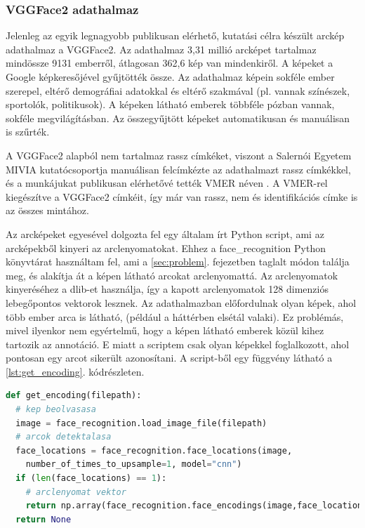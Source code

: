 \subsubsection*{VGGFace2 adathalmaz}

Jelenleg az egyik legnagyobb publikusan elérhető, kutatási célra készült arckép adathalmaz a VGGFace2. Az adathalmaz 3,31 millió arcképet tartalmaz mindössze 9131 emberről, átlagosan 362,6 kép van mindenkiről. A képeket a Google képkeresőjével gyűjtötték össze. Az adathalmaz képein sokféle ember szerepel, eltérő demográfiai adatokkal és eltérő szakmával (pl. vannak színészek, sportolók, politikusok). A képeken látható emberek többféle pózban vannak, sokféle megvilágításban. Az összegyűjtött képeket automatikusan és manuálisan is szűrték.

A VGGFace2 alapból nem tartalmaz rassz címkéket, viszont a Salernói Egyetem MIVIA kutatócsoportja manuálisan felcímkézte az adathalmazt rassz címkékkel, és a munkájukat publikusan elérhetővé tették VMER néven \cite{vmer2020}. A VMER-rel kiegészítve a VGGFace2 címkéit, így már van rassz, nem és identifikációs címke is az összes mintához.

Az arcképeket egyesével dolgozta fel egy általam írt Python script, ami az arcképekből kinyeri az arclenyomatokat. Ehhez a face\_recognition Python könyvtárat \cite{face_recognition} használtam fel, ami a \ref{sec:problem}. fejezetben taglalt módon találja meg, és alakítja át a képen látható arcokat arclenyomattá. Az arclenyomatok kinyeréséhez a dlib-et \cite{dlib2009} használja, így a kapott arclenyomatok 128 dimenziós lebegőpontos vektorok lesznek. Az adathalmazban előfordulnak olyan képek, ahol több ember arca is látható, (például a háttérben elsétál valaki). Ez problémás, mivel ilyenkor nem egyértelmű, hogy a képen látható emberek közül kihez tartozik az annotáció. E miatt a scriptem csak olyan képekkel foglalkozott, ahol pontosan egy arcot sikerült azonosítani. A script-ből egy függvény látható a \ref{lst:get_encoding}. kódrészleten.

\begin{lstlisting}[language=python, caption={Arclenyomat vektorok kinyerése.}, label=lst:get_encoding]
def get_encoding(filepath):
  # kep beolvasasa
  image = face_recognition.load_image_file(filepath) 
  # arcok detektalasa 
  face_locations = face_recognition.face_locations(image,
    number_of_times_to_upsample=1, model="cnn")
  if (len(face_locations) == 1): 
    # arclenyomat vektor
    return np.array(face_recognition.face_encodings(image,face_locations))[1]
  return None
\end{lstlisting}


